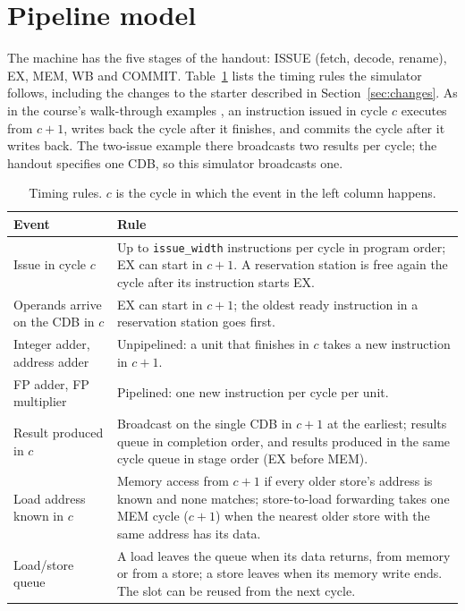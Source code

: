 \documentclass[11pt]{article}
\newcommand{\code}[1]{\texttt{#1}}
\begin{document}
\section{Pipeline model}
\label{sec:model}

The machine has the five stages of the handout: ISSUE (fetch, decode, rename), EX, MEM,
WB and COMMIT. Table~\ref{tab:timing} lists the timing rules the simulator follows, including
the changes to the starter described in Section~\ref{sec:changes}. As in the course's
walk-through examples \cite{oooexample}, an instruction issued in cycle $c$ executes from
$c+1$, writes back the cycle after it finishes, and commits the cycle after it writes back.
The two-issue example there broadcasts two results per cycle; the handout specifies one CDB,
so this simulator broadcasts one.

\begin{table}[htbp]
\centering
\caption{Timing rules. $c$ is the cycle in which the event in the left column happens.}
\label{tab:timing}
\small
\begin{tabular}{@{}p{}p{}@{}}
\toprule
Event & Rule \\
\midrule
Issue in cycle $c$ & Up to \code{issue\_width} instructions per cycle in program order; EX can start in $c+1$. A reservation station is free again the cycle after its instruction starts EX. \\
Operands arrive on the CDB in $c$ & EX can start in $c+1$; the oldest ready instruction in a reservation station goes first. \\
Integer adder, address adder & Unpipelined: a unit that finishes in $c$ takes a new instruction in $c+1$. \\
FP adder, FP multiplier & Pipelined: one new instruction per cycle per unit. \\
Result produced in $c$ & Broadcast on the single CDB in $c+1$ at the earliest; results queue in completion order, and results produced in the same cycle queue in stage order (EX before MEM). \\
Load address known in $c$ & Memory access from $c+1$ if every older store's address is known and none matches; store-to-load forwarding takes one MEM cycle ($c+1$) when the nearest older store with the same address has its data. \\
Load/store queue & A load leaves the queue when its data returns, from memory or from a store; a store leaves when its memory write ends. The slot can be reused from the next cycle. \\

\end{tabular}
\end{table}
\end{document}
